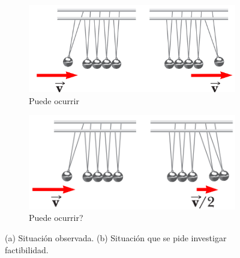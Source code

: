 \documentclass[letterpaper,11pt]{article}
\begin{document}
\begin{enumerate}
\begin{figure}[H]
  \begin{subfigure}[b]{0.4\textwidth}
    \includegraphics[width=\textwidth, height=0.55\textwidth]{2021-2/img/ejercicios/imagen_ej7_2.png}
    \caption{Puede ocurrir}
    \label{fig:f1}
  \end{subfigure}
  \hfill
  \begin{subfigure}[b]{0.4\textwidth}
    \includegraphics[width=\textwidth, height=0.56\textwidth]{2021-2/img/ejercicios/imagen_ej7_3.png}
    \caption{Puede ocurrir?}
    \label{fig:f2}
  \end{subfigure}
  \caption{(a) Situación observada. (b) Situación que se pide investigar factibilidad. }
\end{figure}




\end{enumerate}
\end{document}
